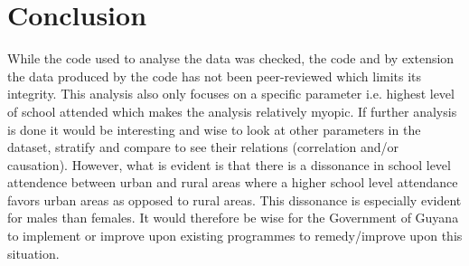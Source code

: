\documentclass[stu, 12pt, floatsintext,longtable]{apa7}
\begin{document}
\section{Conclusion}
While the code used to analyse the data was checked, the code and by extension
the data
produced
by
the code has not been peer-reviewed which limits its integrity.
This analysis
also only focuses on a specific parameter i.e. highest level of school
attended which makes the analysis relatively myopic. If further analysis is
done
it would be interesting and wise to look at other parameters in the dataset,
stratify and compare to see their relations (correlation and/or causation).
However, what is evident is that there is a dissonance in school level
attendence between urban and rural areas where a higher school level attendance
favors urban areas as opposed to rural areas. This dissonance is especially
evident for males than females. It would therefore be wise for the Government
of Guyana to implement or improve upon existing programmes to remedy/improve
upon this situation.
\printbibliography
\end{document}
